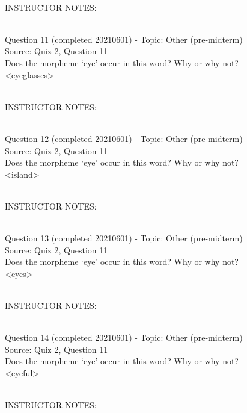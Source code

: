 \documentclass[12pt]{article}
\begin{document}
~\\
INSTRUCTOR NOTES: 


~\\

{\large Question 11} (completed 20210601) - Topic: Other (pre-midterm)\\
Source: Quiz 2, Question 11\\

Does the morpheme ‘eye’ occur in this word? Why or why not?\\

<eyeglasses>


~\\
INSTRUCTOR NOTES: 


~\\

{\large Question 12} (completed 20210601) - Topic: Other (pre-midterm)\\
Source: Quiz 2, Question 11\\

Does the morpheme ‘eye’ occur in this word? Why or why not?\\

<island>


~\\
INSTRUCTOR NOTES: 


~\\

{\large Question 13} (completed 20210601) - Topic: Other (pre-midterm)\\
Source: Quiz 2, Question 11\\

Does the morpheme ‘eye’ occur in this word? Why or why not?\\

<eyes>


~\\
INSTRUCTOR NOTES: 


~\\

{\large Question 14} (completed 20210601) - Topic: Other (pre-midterm)\\
Source: Quiz 2, Question 11\\

Does the morpheme ‘eye’ occur in this word? Why or why not?\\

<eyeful>


~\\
INSTRUCTOR NOTES: 


~\\
\end{document}
